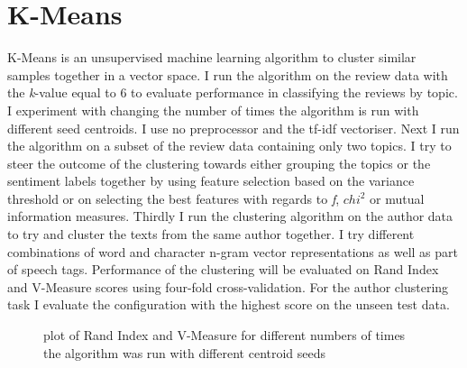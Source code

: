 \documentclass[11pt]{article}
\begin{document}
\section{K-Means}

K-Means is an unsupervised machine learning algorithm to cluster similar samples together in a vector space. I run the algorithm on the review data with the \emph{k}-value equal to 6 to evaluate performance in classifying the reviews by topic. I experiment with changing the number of times the algorithm is run with different seed centroids. I use no preprocessor and the tf-idf vectoriser. Next I run the algorithm on a subset of the review data containing only two topics. I try to steer the outcome of the clustering towards either grouping the topics or the sentiment labels together by using feature selection based on the variance threshold or on selecting the best features with regards to \emph{f}, \emph{$chi^2$} or mutual information measures. Thirdly I run the clustering algorithm on the author data to try and cluster the texts from the same author together. I try different combinations of word and character n-gram vector representations as well as part of speech tags. Performance of the clustering will be evaluated on Rand Index and V-Measure scores using four-fold cross-validation. For the author clustering task I evaluate the configuration with the highest score on the unseen test data.

\begin{figure}
  \caption{plot of Rand Index and V-Measure for different numbers of times the algorithm was run with different centroid seeds}
  \label{fig:k-seeds}
\end{figure}
\end{document}

